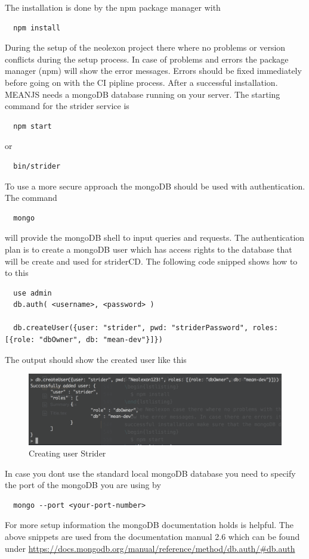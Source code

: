 The installation is done by the npm package manager with
\begin{lstlisting}
  npm install
\end{lstlisting}


During the setup of the neolexon project there where no problems or version conflicts during the setup process. In case of problems and errors
the package manager (npm) will show the error messages. Errors should be fixed immediately before going on with the CI pipline process. After a
successful installation. MEANJS needs a mongoDB database running on your server. The starting command for the strider service is
\begin{lstlisting}
  npm start
\end{lstlisting}
or
\begin{lstlisting}
  bin/strider
\end{lstlisting}
To use a more secure approach the mongoDB should be used with authentication. The command
\begin{lstlisting}
  mongo
\end{lstlisting}
will provide the mongoDB shell to input queries and requests. The authentication plan is to create a mongoDB user which has access
rights to the database that will be create and used for striderCD. The following code snipped shows how to to this
\begin{lstlisting}
  use admin
  db.auth( <username>, <password> )

  db.createUser({user: "strider", pwd: "striderPassword", roles: [{role: "dbOwner", db: "mean-dev"}]})
\end{lstlisting}
The output should show the created user like this
\begin{figure}[h!]
  \centering
  \includegraphics[width=1\textwidth]{images/createUser.png}
  \caption{Creating user Strider}
\end{figure}
In case you dont use the standard local mongoDB database you need to specify the port of the mongoDB you are using by
\begin{lstlisting}
  mongo --port <your-port-number>
\end{lstlisting}
For more setup information the mongoDB documentation holds is helpful. The above snippets are
used from the documentation manual 2.6 which can be found under \url{https://docs.mongodb.org/manual/reference/method/db.auth/#db.auth}

